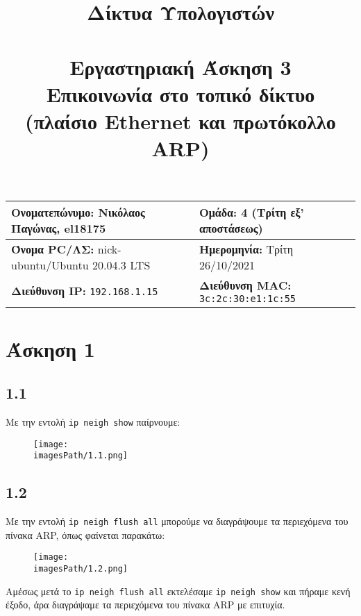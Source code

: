 

\newcommand{\imagesPath}{.}

\title{
	\textbf{Δίκτυα Υπολογιστών} \\~\\
	Εργαστηριακή Άσκηση 3 \\ 
	Επικοινωνία στο τοπικό δίκτυο \\
	(πλαίσιο Ethernet και πρωτόκολλο ARP)
}
\author{}
\date{}


	\maketitle
	
	\begin{tabular}{|l|l|}
		\hline
		\textbf{Ονοματεπώνυμο:} Νικόλαος Παγώνας, el18175 & \textbf{Ομάδα:} 4 (Τρίτη εξ' αποστάσεως) \\
		\hline
		\textbf{Όνομα PC/ΛΣ:} nick-ubuntu/Ubuntu 20.04.3 LTS & \textbf{Ημερομηνία:} Τρίτη 26/10/2021 \\
		\hline
		\textbf{Διεύθυνση IP:} \verb|192.168.1.15| & \textbf{Διεύθυνση MAC:} \verb|3c:2c:30:e1:1c:55|\\
		\hline
	\end{tabular}

	\section*{Άσκηση 1}
		\subsection*{1.1}
			Με την εντολή \verb|ip neigh show| παίρνουμε:
			
			\begin{figure}[H]
				\texttt{[image: \\imagesPath/1.1.png]}
			\end{figure}
			
		\subsection*{1.2}
			Με την εντολή \verb|ip neigh flush all| μπορούμε να διαγράψουμε τα περιεχόμενα του πίνακα ARP, όπως φαίνεται παρακάτω: 
			
			\begin{figure}[H]
				\texttt{[image: \\imagesPath/1.2.png]}
			\end{figure}
		
			Αμέσως μετά το \verb|ip neigh flush all| εκτελέσαμε \verb|ip neigh show| και πήραμε κενή έξοδο, άρα διαγράψαμε τα περιεχόμενα του πίνακα ARP με επιτυχία.
			
